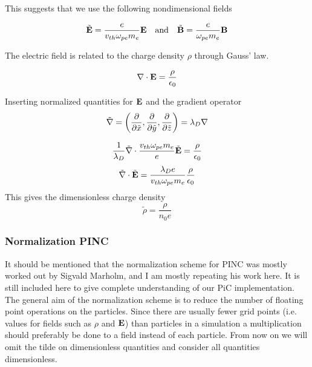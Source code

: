         This suggests that we use the following nondimensional fields

        \begin{equation}
            \tilde{\vb{E}} = \frac{e}{v_{th}\omega_{pe}m_e}\vb{E} \quad{\text{and}} \quad \tilde{\vb{B}} = \frac{e}{\omega_{pe}m_e}\vb{B}
        \end{equation}

        The electric field is related to the charge density \(\rho\) through Gauss'
        law.

        \begin{equation}
            \nabla \cdot \vb{E} = \frac{\rho}{\epsilon_0}
        \end{equation}

        Inserting normalized quantities for \(\vb{E}\) and the gradient operator
        \[\tilde{\nabla}=\left(\pdv{\tilde x}, \pdv{\tilde y} , \pdv{\tilde z}\right) = \lambda_D \nabla\]

        \begin{equation}
            \frac{1}{\lambda_D}\tilde\nabla \cdot \frac{v_{th}\omega_{pe}m_e}{e}\tilde{\vb{E}} = \frac{\rho}{\epsilon_0}
        \end{equation}
        \begin{equation}
            \tilde\nabla \cdot\tilde{\vb{E}} = \frac{\lambda_De}{v_{th}\omega_{pe}m_e}\frac{\rho}{\epsilon_0}
        \end{equation}
        This gives the dimensionless charge density
        \begin{equation}
            \tilde \rho = \frac{\rho}{n_0e}
        \end{equation}

    \subsubsection{Normalization PINC}
        It should be mentioned that the normalization scheme for PINC was mostly worked
        out by Sigvald Marholm, and I am mostly repeating his work here. It is still
        included here to give complete understanding of our PiC implementation.
        The general aim of the normalization scheme is to reduce the number of
        floating point operations on the particles. Since there are usually
        fewer grid points (i.e. values for fields such as \(\rho\) and \(\vb{E}\))
        than particles in a simulation a multiplication should preferably be done to
        a field instead of each particle. From now on we will omit the tilde on dimensionless
        quantities and consider all quantities dimensionless.

